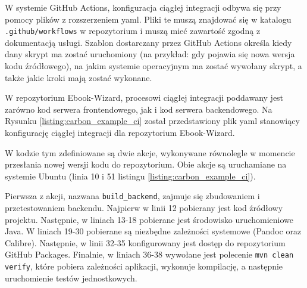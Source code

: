 W systemie GitHub Actions, konfiguracja ciągłej integracji odbywa się przy pomocy plików z rozszerzeniem yaml. Pliki te muszą znajdować się w katalogu \verb|.github/workflows| w repozytorium i muszą mieć zawartość zgodną z dokumentacją usługi. Szablon dostarczany przez GitHub Actions określa kiedy dany skrypt ma zostać uruchomiony (na przykład: gdy pojawia się nowa wersja kodu źródłowego), na jakim systemie operacyjnym ma zostać wywołany skrypt, a także jakie kroki mają zostać wykonane. \cite{github_actions_docs}

W repozytorium Ebook-Wizard, procesowi ciągłej integracji poddawany jest zarówno kod serwera frontendowego, jak i kod serwera backendowego. Na Rysunku \ref{listing:carbon_example_ci} został przedstawiony plik yaml stanowiący konfigurację ciągłej integracji dla repozytorium Ebook-Wizard. 

W kodzie tym zdefiniowane są dwie akcje, wykonywane równolegle w momencie przesłania nowej wersji kodu do repozytorium. Obie akcje są uruchamiane na systemie Ubuntu (linia 10 i 51 listingu \ref{listing:carbon_example_ci}). 

Pierwsza z akcji, nazwana \verb|build_backend|, zajmuje się zbudowaniem i przetestowaniem backendu. Najpierw w linii 12 pobierany jest kod źródłowy projektu. Następnie, w liniach 13-18 pobierane jest środowisko uruchomieniowe Java. W liniach 19-30 pobierane są niezbędne zależności systemowe (Pandoc oraz Calibre). Następnie, w linii 32-35 konfigurowany jest dostęp do repozytorium GitHub Packages. Finalnie, w liniach 36-38 wywołane jest polecenie \verb|mvn clean verify|, które pobiera zależności aplikacji, wykonuje kompilację, a następnie uruchomienie testów jednostkowych.

